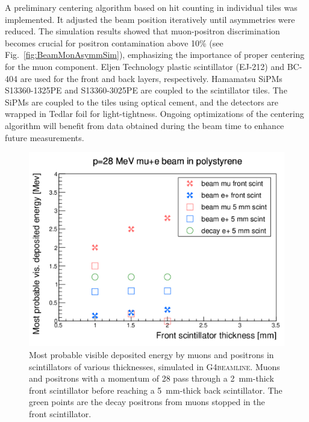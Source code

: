 \begin{refsection}
        A preliminary centering algorithm based on hit counting in individual tiles was implemented. 
        It adjusted the beam position iteratively until asymmetries were reduced. 
        The simulation results showed that muon-positron discrimination becomes crucial for positron contamination above 10\% (see Fig.~\ref{fig:BeamMonAsymmSim}), emphasizing the importance of proper centering for the muon component.
        Eljen Technology plastic scintillator (EJ-212) and BC-404 are used for the front and back layers, respectively. 
        Hamamatsu SiPMs S13360-1325PE and S13360-3025PE are coupled to the scintillator tiles. 
        The SiPMs are coupled to the tiles using optical cement, and the detectors are wrapped in Tedlar foil for light-tightness. 
        Ongoing optimizations of the centering algorithm will benefit from data obtained during the beam time to enhance future measurements.

        \begin{figure}
            \centering
            \includegraphics[width=0.5\linewidth]{Figures/muEDM/BeamMonitor/BeamMon_2mmScint_g4bl.png}
            \caption{Most probable visible deposited energy by muons and positrons in scintillators of various thicknesses, simulated in \textsc{G4beamline}. Muons and positrons with a momentum of \SI{28}{\MeVc} pass through a \SI{2}{mm}-thick front scintillator before reaching a \SI{5}{mm}-thick back scintillator. The green points are the decay positrons from muons stopped in the front scintillator.}
            \label{fig:BeamMonSimDepositedEn}
        \end{figure}
        

\end{refsection}
